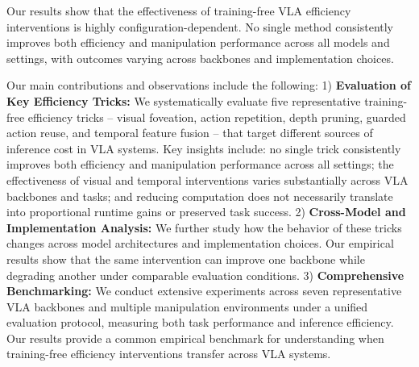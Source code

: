 Our results show that the effectiveness of training-free VLA efficiency interventions is highly configuration-dependent. No single method consistently improves both efficiency and manipulation performance across all models and settings, with outcomes varying across backbones and implementation choices.

Our main contributions and observations include the following: 1) \textbf{Evaluation of Key Efficiency Tricks:} We systematically evaluate five representative training-free efficiency tricks -- visual foveation, action repetition, depth pruning, guarded action reuse, and temporal feature fusion -- that target different sources of inference cost in VLA systems. Key insights include: no single trick consistently improves both efficiency and manipulation performance across all settings; the effectiveness of visual and temporal interventions varies substantially across VLA backbones and tasks; and reducing computation does not necessarily translate into proportional runtime gains or preserved task success. 2) \textbf{Cross-Model and Implementation Analysis:} We further study how the behavior of these tricks changes across model architectures and implementation choices. Our empirical results show that the same intervention can improve one backbone while degrading another under comparable evaluation conditions. 3) \textbf{Comprehensive Benchmarking:} We conduct extensive experiments across seven representative VLA backbones and multiple manipulation environments under a unified evaluation protocol, measuring both task performance and inference efficiency. Our results provide a common empirical benchmark for understanding when training-free efficiency interventions transfer across VLA systems.
